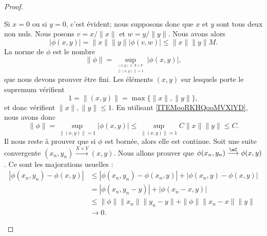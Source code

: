 \begin{proof}
\begin{subproof}
		Si \( x=0\) ou si \( y=0\), c'est évident; nous supposons donc que \( x\) et \( y\) sont tous deux non nuls. Nous posons \( v=x/\| x \|\) et \( w=y/\| y \|\). Nous avons alors
		\begin{equation}
			| \phi(x,y) |=\| x \|\| y \| |\phi(v,w) |\leq \| x \|\| y \|M.
		\end{equation}
		\spitem[\ref{ITEMooRKHQooMVXlYD} \( \Rightarrow\) \ref{ITEMooLWDCooLIGVDs}]
		La norme de \( \phi\) est le nombre
		\begin{equation}
			\| \phi \|=\sup_{_{\substack{(x,y)\in X\times Y\\\| (x,y) \|=1}}}| \phi(x,y) |,
		\end{equation}
		que nous devons prouver être fini. Les éléments \( (x,y)\) sur lesquels porte le supremum vérifient
		\begin{equation}
			1=\| (x,y) \|=\max\{ \| x \|,\| y \| \},
		\end{equation}
		et donc vérifient \( \| x \|,\| y \|\leq 1\). En utilisant \ref{ITEMooRKHQooMVXlYD}, nous avons donc
		\begin{equation}
			\| \phi \|=\sup_{\| (x,y) \|=1}| \phi(x,y) |\leq  \sup_{\| (x,y) \|=1} C\| x \|\| y \|\leq C.
		\end{equation}
		\spitem[\ref{ITEMooLWDCooLIGVDs} \( \Rightarrow\) \ref{ITEMooWMFBooOWPzgP}]
		Il nous reste à prouver que si \( \phi\) est bornée, alors elle est continue. Soit une suite convergente \( (x_n,y_n)\stackrel{X\times Y}{\longrightarrow}(x,y)\). Nous allons prouver que \( \phi(x_n,y_n)\stackrel{\eC}{\longrightarrow}\phi(x,y)\). Ce sont les majorations usuelles :
		\begin{subequations}
			\begin{align}
				| \phi(x_n,y_n)-\phi(x,y) | & \leq | \phi(x_n,y_n)-\phi(x_n,y) |+| \phi(x_n,y)-\phi(x,y) |     \\
				                            & =| \phi(x_n,y_n-y) |+| \phi(x_n-x,y) |                           \\
				                            & \leq \| \phi \|\| x_n \|\| y_n-y \|+\| \phi \|\| x_n-x \|\| y \| \\
				                            & \to 0.
			\end{align}
		\end{subequations}
	\end{subproof}


\end{proof}
